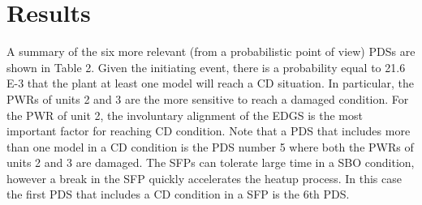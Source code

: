 \section{Results}
\label{sec:results}

A summary of the six more relevant (from a probabilistic point of view) PDSs are shown in Table 2. 
Given the initiating event, there is a probability equal to 21.6 E-3 that the plant at least one model 
will reach a CD situation. In particular, the PWRs of units 2 and 3 are the more sensitive to reach a 
damaged condition. For the PWR of unit 2, the involuntary alignment of the EDGS is the most important 
factor for reaching CD condition.
Note that a PDS that includes more than one model in a CD condition is the PDS number 5 where both the 
PWRs of units 2 and 3 are damaged.
The SFPs can tolerate large time in a SBO condition, however a break in the SFP quickly accelerates 
the heatup process. In this case the first PDS that includes a CD condition in a SFP is the 6th PDS.

